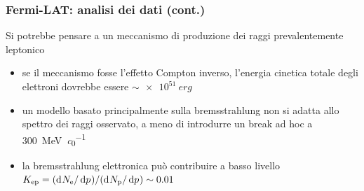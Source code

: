 \documentclass[10pt]{beamer}
\newcommand*{\dd}{\mathop{}\!\textup{d}} %
\newcommand*{\toder}[3][]{\frac{{\dd^{#1}}#2}{\dd {#3}^{#1}}}
\newcommand*{\ltoder}[3][]{{\dd^{#1}}#2/\dd {#3}^{#1}}
\newcommand{\pro}{\color{alerted text.fg}{\ding{51}}}
\newcommand{\con}{\color{alerted text.fg}{\ding{55}}}
\begin{document}

\begin{frame}
  \frametitle{Fermi-LAT: analisi dei dati (cont.)}
  Si potrebbe pensare a un meccanismo di produzione dei raggi \PGg
  prevalentemente leptonico
  \begin{itemize}
  \item[\con] se il meccanismo fosse l'effetto Compton inverso, l'energia
    cinetica totale degli elettroni dovrebbe essere $\sim \SI{e51}{erg}$
  \item[\con] un modello basato principalmente sulla bremsstrahlung non si
    adatta allo spettro dei raggi \PGg osservato, a meno di introdurre un break
    ad hoc a \SI{300}{\mega\electronvolt\per\clight}
  \item[\pro] la bremsstrahlung elettronica può contribuire a basso livello
    $K_{\textup{ep}} = (\ltoder{N_{\textup{e}}}{p})/(\ltoder{N_{\textup{p}}}{p})
    \sim 0.01$
  \end{itemize}
\end{frame}
\end{document}
